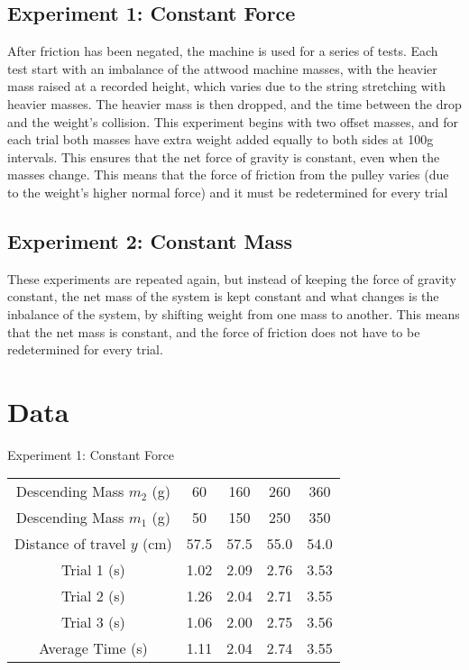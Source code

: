 \documentclass[12pt]{article}
\begin{document}
        \subsection{Experiment 1: Constant Force}
            After friction has been negated, the machine is used for a series of
            tests. Each test start with an imbalance of the attwood machine masses,
            with the heavier mass raised at a recorded height, which varies due to
            the string stretching with heavier masses. The heavier mass is
            then dropped, and the time between the drop and the weight's collision.
            This experiment begins with two offset masses, and for each trial
            both masses have extra weight added equally to both sides at 100g
            intervals. This ensures that the net force of gravity is constant,
            even when the masses change. This means that the force of friction 
            from the pulley varies (due to the weight's higher normal force)
            and it must be redetermined for every trial
        \subsection{Experiment 2: Constant Mass}
            These experiments are repeated again, but instead of keeping the force
            of gravity constant, the net mass of the system is kept constant and
            what changes is the inbalance of the system, by shifting weight from 
            one mass to another. This means that the net mass is constant,
            and the force of friction does not have to be redetermined for
            every trial.
    \section{Data}
        {\large Experiment 1: Constant Force}
        \begin{center}
    
            \begin{tabular} {|c|c|c|c|c|}
            \hline
                Descending Mass $m_2$ (g) & 60 & 160 & 260 & 360 \\
                Descending Mass $m_1$ (g) & 50 & 150 & 250 & 350 \\
            \hline
            \hline
                Distance of travel $y$ (cm) & 57.5 & 57.5 & 55.0 & 54.0 \\
            \hline
            \hline
                Trial 1 (s) & 1.02 & 2.09 & 2.76 & 3.53 \\
                Trial 2 (s) & 1.26 & 2.04 & 2.71 & 3.55 \\
                Trial 3 (s) & 1.06 & 2.00 & 2.75 & 3.56 \\
                Average Time (s) & 1.11 & 2.04 & 2.74 & 3.55 \\
            \hline
                
            \end{tabular}
        \end{center}
\end{document}
